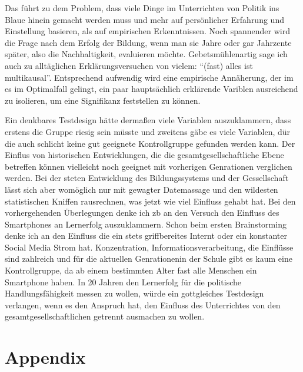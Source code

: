 Das führt zu dem Problem, dass viele Dinge im Unterrichten von Politik ins Blaue hinein gemacht werden muss und mehr auf persönlicher Erfahrung und Einstellung basieren, als auf empirischen Erkenntnissen.
Noch spannender wird die Frage nach dem Erfolg der Bildung, wenn man sie Jahre oder gar Jahrzente später, also die Nachhaltigkeit, evaluieren möchte. Gebetsmühlenartig sage ich auch zu alltäglichen Erklärungsversuchen von vielem: \enquote{(fast) alles ist multikausal}. Entsprechend aufwendig wird eine empirische Annäherung, der im es im Optimalfall gelingt, ein paar hauptsächlich erklärende Variblen ausreichend zu isolieren, um eine Signifikanz feststellen zu können. 


Ein denkbares Testdesign hätte dermaßen viele Variablen auszuklammern, dass erstens die Gruppe riesig sein müsste und zweitens gäbe es viele Variablen, dür die auch schlicht keine gut geeignete Kontrollgruppe gefunden werden kann. Der Einflus von historischen Entwicklungen, die die gesamtgesellschaftliche Ebene betreffen können vielleicht noch geeignet mit vorherigen Genrationen verglichen werden. Bei der steten Entwicklung des Bildungssystems und der Gessellschaft lässt sich aber womöglich nur mit gewagter Datemassage und den wildesten statistischen Kniffen rausrechnen, was jetzt wie viel Einfluss gehabt hat. 
Bei den vorhergehenden Überlegungen denke ich \gls{zb} an den Versuch den Einfluss des Smartphones an Lernerfolg auszuklammern. Schon beim ersten Brainstorming denke ich an den Einfluss die ein stets griffbereites Internt oder ein konstanter Social Media Strom hat. Konzentration, Informationsverarbeitung, die Einflüsse sind zahlreich und für die aktuellen Genrationenin der Schule gibt es kaum eine Kontrollgruppe, da ab einem bestimmten Alter fast alle Menschen ein Smartphone haben. In 20 Jahren den Lernerfolg für die politische Handlungsfähigkeit messen zu wollen, würde ein gottgleiches Testdesign verlangen, wenn es den Anspruch hat, den Einfluss des Unterrichtes von den gesamtgesellschaftlichen getrennt ausmachen zu wollen. 



\clearpage
\newpage
\printbibliography[title=Literaturverzeichnis, heading=bibintoc, nottype=unused] 

\appendix %

\section{Appendix}
